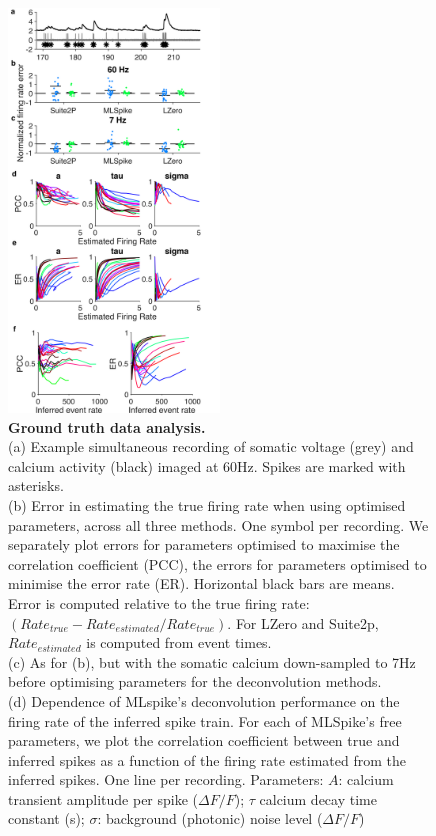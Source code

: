 \documentclass[a4paper,11pt]{article}
\begin{document}
\begin{figure}
	\centering
	\includegraphics[width=0.5\textwidth]{composite_figs/fig1_ground_truth.png}
	\caption{\textbf{Ground truth data analysis.} \label{fig:GT_data} \\
		(a) Example simultaneous recording of somatic voltage (grey) and calcium activity (black) imaged at 60Hz. Spikes are marked with asterisks. \\ 
		(b) Error in estimating the true firing rate when using optimised parameters, across all three methods. One symbol per recording. We separately plot errors for parameters optimised to maximise the correlation coefficient (PCC), the errors for parameters optimised to minimise the error rate (ER). Horizontal black bars are means. Error is computed relative to the true firing rate: $(Rate_{true} - Rate_{estimated} / Rate_{true})$. For LZero and Suite2p, $Rate_{estimated}$ is computed from event times.  \\
		(c) As for (b), but with the somatic calcium down-sampled to 7Hz before optimising parameters for the deconvolution methods. \\
		(d) Dependence of MLspike's deconvolution performance on the firing rate of the inferred spike train. For each of MLSpike's free parameters, we plot the correlation coefficient between true and inferred spikes as a function of the firing rate estimated from the inferred spikes. One line per recording. Parameters: $A$: calcium transient amplitude per spike ($\Delta F/F$); $\tau$ calcium decay time constant (s); $\sigma$: background (photonic) noise level ($\Delta F/F$)\\
}
\end{figure}
\end{document}
